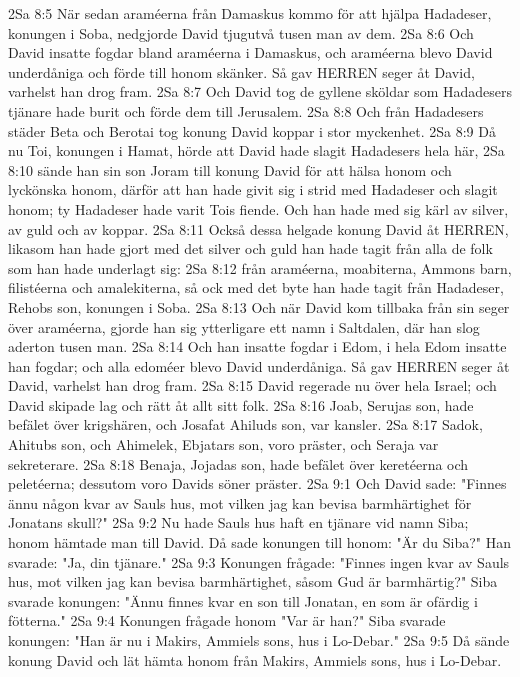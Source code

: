 2Sa 8:5  När sedan araméerna från Damaskus kommo för att hjälpa Hadadeser, konungen i Soba, nedgjorde David tjugutvå tusen man av dem.
2Sa 8:6  Och David insatte fogdar bland araméerna i Damaskus, och araméerna blevo David underdåniga och förde till honom skänker. Så gav HERREN seger åt David, varhelst han drog fram.
2Sa 8:7  Och David tog de gyllene sköldar som Hadadesers tjänare hade burit och förde dem till Jerusalem.
2Sa 8:8  Och från Hadadesers städer Beta och Berotai tog konung David koppar i stor myckenhet.
2Sa 8:9  Då nu Toi, konungen i Hamat, hörde att David hade slagit Hadadesers hela här,
2Sa 8:10  sände han sin son Joram till konung David för att hälsa honom och lyckönska honom, därför att han hade givit sig i strid med Hadadeser och slagit honom; ty Hadadeser hade varit Tois fiende. Och han hade med sig kärl av silver, av guld och av koppar.
2Sa 8:11  Också dessa helgade konung David åt HERREN, likasom han hade gjort med det silver och guld han hade tagit från alla de folk som han hade underlagt sig:
2Sa 8:12  från araméerna, moabiterna, Ammons barn, filistéerna och amalekiterna, så ock med det byte han hade tagit från Hadadeser, Rehobs son, konungen i Soba.
2Sa 8:13  Och när David kom tillbaka från sin seger över araméerna, gjorde han sig ytterligare ett namn i Saltdalen, där han slog aderton tusen man.
2Sa 8:14  Och han insatte fogdar i Edom, i hela Edom insatte han fogdar; och alla edoméer blevo David underdåniga. Så gav HERREN seger åt David, varhelst han drog fram.
2Sa 8:15  David regerade nu över hela Israel; och David skipade lag och rätt åt allt sitt folk.
2Sa 8:16  Joab, Serujas son, hade befälet över krigshären, och Josafat Ahiluds son, var kansler.
2Sa 8:17  Sadok, Ahitubs son, och Ahimelek, Ebjatars son, voro präster, och Seraja var sekreterare.
2Sa 8:18  Benaja, Jojadas son, hade befälet över keretéerna och peletéerna; dessutom voro Davids söner präster.
2Sa 9:1  Och David sade: "Finnes ännu någon kvar av Sauls hus, mot vilken jag kan bevisa barmhärtighet för Jonatans skull?"
2Sa 9:2  Nu hade Sauls hus haft en tjänare vid namn Siba; honom hämtade man till David. Då sade konungen till honom: "Är du Siba?" Han svarade: "Ja, din tjänare."
2Sa 9:3  Konungen frågade: "Finnes ingen kvar av Sauls hus, mot vilken jag kan bevisa barmhärtighet, såsom Gud är barmhärtig?" Siba svarade konungen: "Ännu finnes kvar en son till Jonatan, en som är ofärdig i fötterna."
2Sa 9:4  Konungen frågade honom "Var är han?" Siba svarade konungen: "Han är nu i Makirs, Ammiels sons, hus i Lo-Debar."
2Sa 9:5  Då sände konung David och lät hämta honom från Makirs, Ammiels sons, hus i Lo-Debar.
